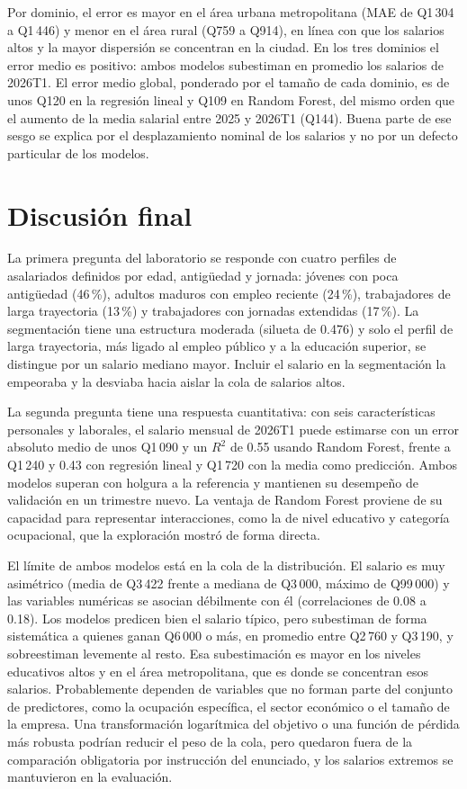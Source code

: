 \documentclass[11pt,a4paper]{article}
\begin{document}
Por dominio, el error es mayor en el área urbana metropolitana (MAE de Q1\,304 a Q1\,446) y menor en el área rural (Q759 a Q914), en línea con que los salarios altos y la mayor dispersión se concentran en la ciudad. En los tres dominios el error medio es positivo: ambos modelos subestiman en promedio los salarios de 2026T1. El error medio global, ponderado por el tamaño de cada dominio, es de unos Q120 en la regresión lineal y Q109 en Random Forest, del mismo orden que el aumento de la media salarial entre 2025 y 2026T1 (Q144). Buena parte de ese sesgo se explica por el desplazamiento nominal de los salarios y no por un defecto particular de los modelos.

\section{Discusión final}

La primera pregunta del laboratorio se responde con cuatro perfiles de asalariados definidos por edad, antigüedad y jornada: jóvenes con poca antigüedad (46\,\%), adultos maduros con empleo reciente (24\,\%), trabajadores de larga trayectoria (13\,\%) y trabajadores con jornadas extendidas (17\,\%). La segmentación tiene una estructura moderada (silueta de 0.476) y solo el perfil de larga trayectoria, más ligado al empleo público y a la educación superior, se distingue por un salario mediano mayor. Incluir el salario en la segmentación la empeoraba y la desviaba hacia aislar la cola de salarios altos.

La segunda pregunta tiene una respuesta cuantitativa: con seis características personales y laborales, el salario mensual de 2026T1 puede estimarse con un error absoluto medio de unos Q1\,090 y un $R^2$ de 0.55 usando Random Forest, frente a Q1\,240 y 0.43 con regresión lineal y Q1\,720 con la media como predicción. Ambos modelos superan con holgura a la referencia y mantienen su desempeño de validación en un trimestre nuevo. La ventaja de Random Forest proviene de su capacidad para representar interacciones, como la de nivel educativo y categoría ocupacional, que la exploración mostró de forma directa.

El límite de ambos modelos está en la cola de la distribución. El salario es muy asimétrico (media de Q3\,422 frente a mediana de Q3\,000, máximo de Q99\,000) y las variables numéricas se asocian débilmente con él (correlaciones de 0.08 a 0.18). Los modelos predicen bien el salario típico, pero subestiman de forma sistemática a quienes ganan Q6\,000 o más, en promedio entre Q2\,760 y Q3\,190, y sobreestiman levemente al resto. Esa subestimación es mayor en los niveles educativos altos y en el área metropolitana, que es donde se concentran esos salarios. Probablemente dependen de variables que no forman parte del conjunto de predictores, como la ocupación específica, el sector económico o el tamaño de la empresa. Una transformación logarítmica del objetivo o una función de pérdida más robusta podrían reducir el peso de la cola, pero quedaron fuera de la comparación obligatoria por instrucción del enunciado, y los salarios extremos se mantuvieron en la evaluación.
\end{document}
